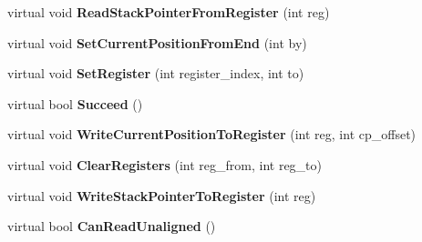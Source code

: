 \begin{DoxyCompactItemize}
\item 
virtual void {\bfseries Read\+Stack\+Pointer\+From\+Register} (int reg)\hypertarget{classv8_1_1internal_1_1_reg_exp_macro_assembler_a_r_m64_a5c973d03be28a5d92d7fac48a90cdd3c}{}\label{classv8_1_1internal_1_1_reg_exp_macro_assembler_a_r_m64_a5c973d03be28a5d92d7fac48a90cdd3c}

\item 
virtual void {\bfseries Set\+Current\+Position\+From\+End} (int by)\hypertarget{classv8_1_1internal_1_1_reg_exp_macro_assembler_a_r_m64_af1f8bb95900a4eb030759192086ca202}{}\label{classv8_1_1internal_1_1_reg_exp_macro_assembler_a_r_m64_af1f8bb95900a4eb030759192086ca202}

\item 
virtual void {\bfseries Set\+Register} (int register\+\_\+index, int to)\hypertarget{classv8_1_1internal_1_1_reg_exp_macro_assembler_a_r_m64_a8d37a7345f2df08bcb0456439bef23f7}{}\label{classv8_1_1internal_1_1_reg_exp_macro_assembler_a_r_m64_a8d37a7345f2df08bcb0456439bef23f7}

\item 
virtual bool {\bfseries Succeed} ()\hypertarget{classv8_1_1internal_1_1_reg_exp_macro_assembler_a_r_m64_ab1c3921c6c1258733665f169450e8b90}{}\label{classv8_1_1internal_1_1_reg_exp_macro_assembler_a_r_m64_ab1c3921c6c1258733665f169450e8b90}

\item 
virtual void {\bfseries Write\+Current\+Position\+To\+Register} (int reg, int cp\+\_\+offset)\hypertarget{classv8_1_1internal_1_1_reg_exp_macro_assembler_a_r_m64_a3f56d5d4692db1a758463a1da3d6f425}{}\label{classv8_1_1internal_1_1_reg_exp_macro_assembler_a_r_m64_a3f56d5d4692db1a758463a1da3d6f425}

\item 
virtual void {\bfseries Clear\+Registers} (int reg\+\_\+from, int reg\+\_\+to)\hypertarget{classv8_1_1internal_1_1_reg_exp_macro_assembler_a_r_m64_af0d524fc966e186f1f00111aab709f23}{}\label{classv8_1_1internal_1_1_reg_exp_macro_assembler_a_r_m64_af0d524fc966e186f1f00111aab709f23}

\item 
virtual void {\bfseries Write\+Stack\+Pointer\+To\+Register} (int reg)\hypertarget{classv8_1_1internal_1_1_reg_exp_macro_assembler_a_r_m64_a6b24304a16ed28c170cdc381acd7a87a}{}\label{classv8_1_1internal_1_1_reg_exp_macro_assembler_a_r_m64_a6b24304a16ed28c170cdc381acd7a87a}

\item 
virtual bool {\bfseries Can\+Read\+Unaligned} ()\hypertarget{classv8_1_1internal_1_1_reg_exp_macro_assembler_a_r_m64_ac028f66964604d6499d7402fd0f9436f}{}\label{classv8_1_1internal_1_1_reg_exp_macro_assembler_a_r_m64_ac028f66964604d6499d7402fd0f9436f}

\end{DoxyCompactItemize}
